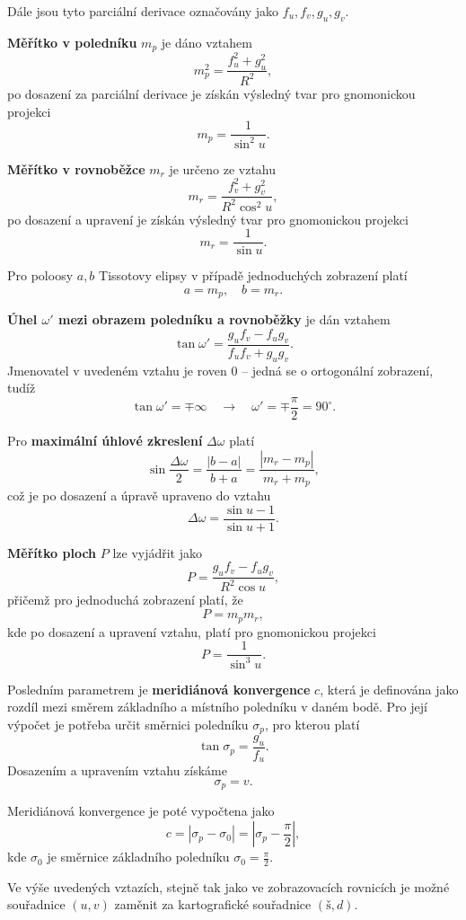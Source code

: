 \documentclass[12pt]{article}
\begin{document}
Dále jsou tyto parciální derivace označovány jako $f_u, f_v, g_u, g_v$.

\noindent \textbf{Měřítko v poledníku} $m_p$ je dáno vztahem
\[
    m_p^2 = \frac{f_u^2 + g_u^2}{R^2},
\]
po dosazení za parciální derivace je získán výsledný tvar pro gnomonickou projekci
\[
    m_p = \frac{1}{\sin^2 u}.
\]

\noindent \textbf{Měřítko v rovnoběžce} $m_r$ je určeno ze vztahu
\[
    m_r = \frac{f_v^2 + g_v^2}{R^2 \cos^2 u},
\]
po dosazení a upravení je získán výsledný tvar pro gnomonickou projekci
\[
    m_r = \frac{1}{\sin u}.
\]

\noindent Pro poloosy $a, b$ Tissotovy elipsy v případě jednoduchých zobrazení platí
\[
    a = m_p, \quad b = m_r.
\]

\noindent \textbf{Úhel $\omega'$ mezi obrazem poledníku a rovnoběžky} je dán vztahem
\[
    \tan \omega' = \frac{g_u f_v - f_u g_v}{f_u f_v + g_u g_v}.
\]
Jmenovatel v uvedeném vztahu je roven 0 -- jedná se o ortogonální zobrazení, tudíž
\[
    \tan \omega' = \mp \infty \quad \rightarrow \quad \omega' = \mp \frac{\pi}{2} = 90^\circ.
\]

\noindent Pro \textbf{maximální úhlové zkreslení} $\Delta\omega$ platí
\[
    \sin \frac{\Delta\omega}{2} = \frac{|b - a|}{b + a} = \frac{|m_r - m_p|}{m_r + m_p},
\]
což je po dosazení a úpravě upraveno do vztahu
\[
    \Delta\omega = \frac{\sin u - 1}{\sin u + 1}.
\]

\noindent \textbf{Měřítko ploch} $P$ lze vyjádřit jako
\[
    P = \frac{g_u f_v - f_u g_v}{R^2 \cos u},
\]
přičemž pro jednoduchá zobrazení platí, že
\[
    P = m_p m_r,
\]
kde po dosazení a upravení vztahu, platí pro gnomonickou projekci
\[
    P = \frac{1}{\sin^3 u}.
\]

\noindent Posledním parametrem je \textbf{meridiánová konvergence} $c$, která je definována jako rozdíl mezi směrem základního a místního poledníku v daném bodě. Pro její výpočet je potřeba určit směrnici poledníku $\sigma_p$, pro kterou platí
\[
    \tan \sigma_p = \frac{g_u}{f_u}.
\]
Dosazením a upravením vztahu získáme
\[
    \sigma_p = v.
\]

\noindent Meridiánová konvergence je poté vypočtena jako
\[
    c = |\sigma_p - \sigma_0| = \left| \sigma_p - \frac{\pi}{2} \right|,
\]
kde $\sigma_0$ je směrnice základního poledníku $\sigma_0 = \frac{\pi}{2}$.
\vspace{0.3cm}

\noindent Ve výše uvedených vztazích, stejně tak jako ve zobrazovacích rovnicích je možné souřadnice $(u, v)$ zaměnit za kartografické souřadnice $(\text{š}, d)$.
\end{document}
